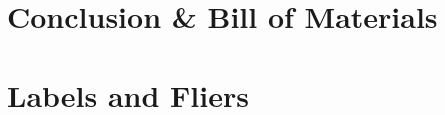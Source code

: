 \documentclass[11pt,oneside]{book}
\begin{document}
\chapter{Conclusion \& Bill of Materials}

\newpage
% 
\chapter{Labels and Fliers}
\newpage
% 
%  

\printbibliography[heading=bibintoc,title={References}]
\end{document}

